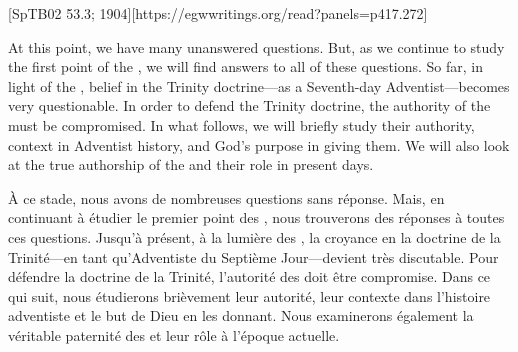 [SpTB02 53.3; 1904][https://egwwritings.org/read?panels=p417.272]


At this point, we have many unanswered questions. But, as we continue to study the first point of the , we will find answers to all of these questions. So far, in light of the , belief in the Trinity doctrine—as a Seventh-day Adventist—becomes very questionable. In order to defend the Trinity doctrine, the authority of the  must be compromised. In what follows, we will briefly study their authority, context in Adventist history, and God’s purpose in giving them. We will also look at the true authorship of the  and their role in present days.


À ce stade, nous avons de nombreuses questions sans réponse. Mais, en continuant à étudier le premier point des , nous trouverons des réponses à toutes ces questions. Jusqu'à présent, à la lumière des , la croyance en la doctrine de la Trinité—en tant qu'Adventiste du Septième Jour—devient très discutable. Pour défendre la doctrine de la Trinité, l'autorité des  doit être compromise. Dans ce qui suit, nous étudierons brièvement leur autorité, leur contexte dans l'histoire adventiste et le but de Dieu en les donnant. Nous examinerons également la véritable paternité des  et leur rôle à l'époque actuelle.


